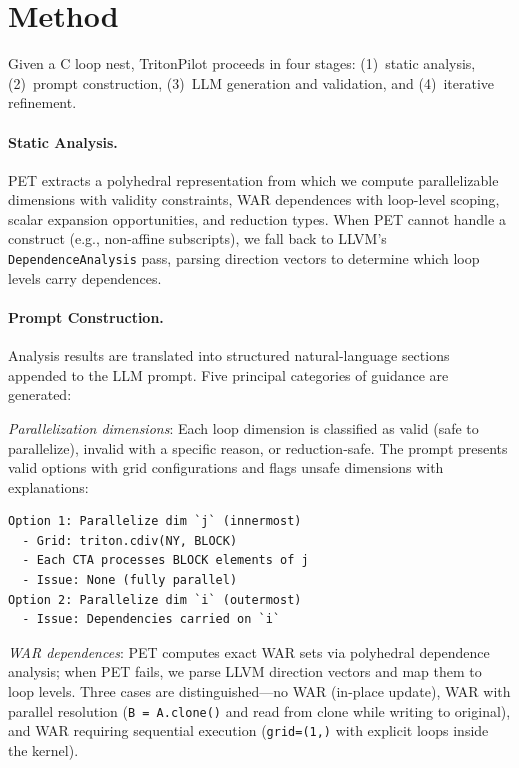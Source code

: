 \documentclass[sigconf]{acmart}
\newcommand{\sysname}{TritonPilot\xspace}
\newcommand{\pet}{PET\xspace}
\begin{document}
\section{Method}
\label{sec:method}

Given a C loop nest, \sysname proceeds in four stages: (1)~static
analysis, (2)~prompt construction, (3)~LLM generation and validation,
and (4)~iterative refinement.

\paragraph{Static Analysis.}
\pet{} extracts a polyhedral representation from which we compute
parallelizable dimensions with validity constraints, WAR dependences
with loop-level scoping, scalar expansion opportunities, and reduction
types.  When \pet{} cannot handle a construct (e.g., non-affine
subscripts), we fall back to LLVM's \texttt{DependenceAnalysis} pass,
parsing direction vectors to determine which loop levels carry
dependences.

\paragraph{Prompt Construction.}
Analysis results are translated into structured natural-language
sections appended to the LLM prompt.  Five principal categories of
guidance are generated:

\emph{Parallelization dimensions}: Each loop dimension is classified as
valid (safe to parallelize), invalid with a specific reason, or
reduction-safe.  The prompt presents valid options with grid
configurations and flags unsafe dimensions with explanations:
\begin{lstlisting}[language={},frame=none,numbers=none,xleftmargin=0em]
Option 1: Parallelize dim `j` (innermost)
  - Grid: triton.cdiv(NY, BLOCK)
  - Each CTA processes BLOCK elements of j
  - Issue: None (fully parallel)
Option 2: Parallelize dim `i` (outermost)
  - Issue: Dependencies carried on `i`
\end{lstlisting}

\emph{WAR dependences}: \pet{} computes exact WAR sets via polyhedral
dependence analysis; when \pet{} fails, we parse LLVM direction vectors
and map them to loop levels.  Three cases are distinguished---no WAR
(in-place update), WAR with parallel resolution (\texttt{B = A.clone()}
and read from clone while writing to original), and WAR requiring
sequential execution (\texttt{grid=(1,)} with explicit loops inside
the kernel).
\end{document}
